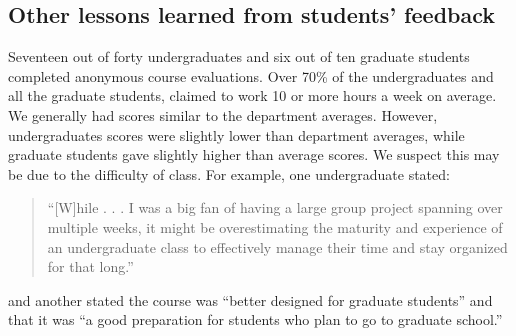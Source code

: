 \begin{itemize}

\end{itemize}

\subsection{Other lessons learned from students' feedback}

Seventeen out of forty undergraduates and six out of ten graduate students
completed anonymous course evaluations.
Over 70\% of the undergraduates and all the graduate students, claimed to work
10 or more hours a week on average.
We generally had scores similar to the department averages.
However, undergraduates scores were slightly lower than department averages,
while graduate students gave slightly higher than average scores.
We suspect this may be due to the difficulty of class.
For example, one undergraduate stated:
\begin{quotation}
``[W]hile . . . I was a big fan of having a large group
project spanning over multiple weeks, it might be overestimating the maturity
and experience of an undergraduate class to effectively manage their time and
stay organized for that long.''
\end{quotation}
and another stated the course was ``better designed for graduate students'' and
that it was ``a good preparation for students who plan to go to graduate
school.''

